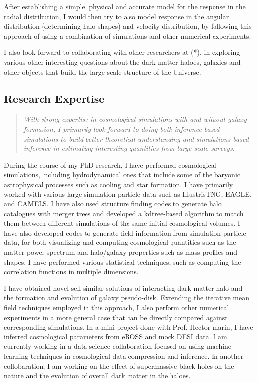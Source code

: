 \documentclass[10pt]{article}
\begin{document}
After establishing a simple, physical and accurate model for the response in the radial distribution, I would then try to also model response in the angular distribution (determining halo shapes) and velocity distribution, by following this approach of using a combination of simulations and other numerical experiments.

I also look forward to collaborating with other researchers at (*), in exploring various other interesting questions about the dark matter haloes, galaxies and other objects that build the large-scale structure of the Universe.

\subsection{Research Expertise}

\begin{quote}
    \textit{With strong expertise in cosmological simulations with and without galaxy formation, I primarily look forward to doing both inference-based simulations to build better theoretical understanding and simulations-based inference in estimating interesting quantities from large-scale surveys.}
\end{quote}

During the course of my PhD research, I have performed cosmological simulations, including hydrodynamical ones that include some of the baryonic astrophysical processes such as cooling and star formation. I have primarily worked with various large simulation particle data such as IllustrisTNG, EAGLE, and CAMELS. I have also used structure finding codes to generate halo catalogues with merger trees and developed a kdtree-based algorithm to match them between different simulations of the same initial cosmological volumes. I have also developed codes to generate field information from simulation particle data, for both visualizing and computing cosmological quantities such as the matter power spectrum and halo/galaxy properties such as mass profiles and shapes. I have performed various statistical techniques, such as computing the correlation functions in multiple dimensions. 

I have obtained novel self-similar solutions of interacting dark matter halo and the formation and evolution of galaxy pseudo-disk. Extending the iterative mean field techniques employed in this approach, I also perform other numerical experiments in a more general case that can be directly compared against corresponding simulations. In a mini project done with Prof. Hector marin, I have inferred cosmological parameters from eBOSS and mock DESI data. I am currently working in a data science collaboration focused on using machine learning techniques in cosmological data compression and inference. In another collobaration, I am working on the effect of supermassive black holes on the nature and the evolution of overall dark matter in the haloes.
\end{document}
